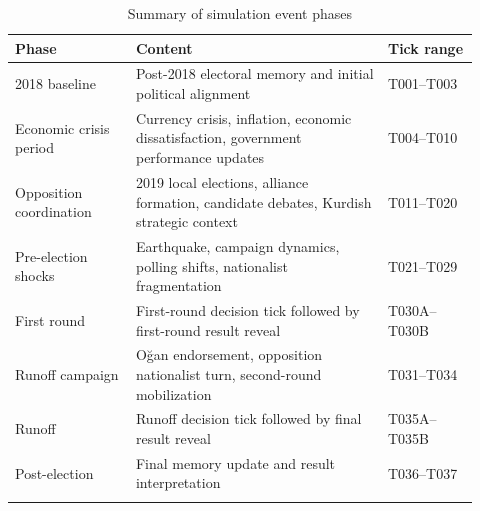 \documentclass[pdflatex,sn-mathphys-num,iicol]{sn-jnl}
\begin{document}
\begin{appendices}
\begin{table}[!htbp]
\caption{Summary of simulation event phases}
\label{tab:event_phases}
\centering
\footnotesize
\begin{tabular}{@{}p{0.24\linewidth}p{0.50\linewidth}p{0.18\linewidth}@{}}
\toprule
Phase & Content & Tick range \\
\midrule
2018 baseline & Post-2018 electoral memory and initial political alignment & T001--T003 \\
Economic crisis period & Currency crisis, inflation, economic dissatisfaction, government performance updates & T004--T010 \\
Opposition coordination & 2019 local elections, alliance formation, candidate debates, Kurdish strategic context & T011--T020 \\
Pre-election shocks & Earthquake, campaign dynamics, polling shifts, nationalist fragmentation & T021--T029 \\
First round & First-round decision tick followed by first-round result reveal & T030A--T030B \\
Runoff campaign & Oğan endorsement, opposition nationalist turn, second-round mobilization & T031--T034 \\
Runoff & Runoff decision tick followed by final result reveal & T035A--T035B \\
Post-election & Final memory update and result interpretation & T036--T037 \\
\botrule
\end{tabular}
\normalsize
\end{table}
\FloatBarrier

\end{appendices}
\FloatBarrier
\end{document}
